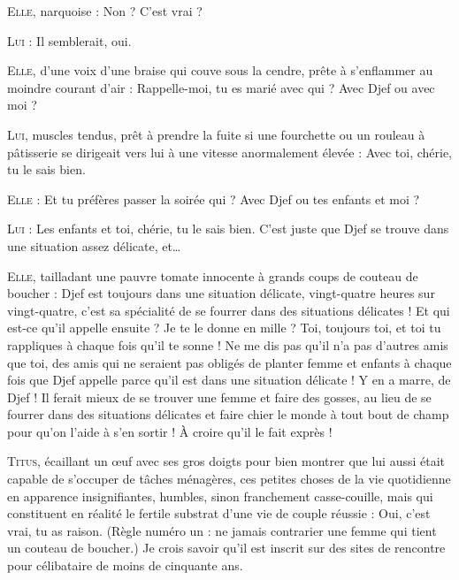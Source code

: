 \begin{dialogue}
\textsc{Elle}, narquoise : Non ? C’est vrai ?

\textsc{Lui} : Il semblerait, oui.

\textsc{Elle}, d’une voix d’une braise qui couve sous la cendre, prête à s’enflammer au moindre courant d’air : Rappelle-moi, tu es marié avec qui ? Avec Djef ou avec moi ?

\textsc{Lui}, muscles tendus, prêt à prendre la fuite si une fourchette ou un rouleau à pâtisserie se dirigeait vers lui à une vitesse anormalement élevée : Avec toi, chérie, tu le sais bien.

\textsc{Elle} : Et tu préfères passer la soirée qui ? Avec Djef ou tes enfants et moi ?

\textsc{Lui} : Les enfants et toi, chérie, tu le sais bien. C’est juste que Djef se trouve dans une situation assez délicate, et…

%
%
%
\textsc{Elle}, tailladant une pauvre tomate innocente à grands coups de couteau de boucher : Djef est toujours dans une situation délicate, vingt-quatre heures sur vingt-quatre, c’est sa spécialité de se fourrer dans des situations délicates ! Et qui est-ce qu’il appelle ensuite ? Je te le donne en mille ? Toi, toujours toi, et toi tu rappliques à chaque fois qu’il te sonne ! Ne me dis pas qu’il n’a pas d’autres amis que toi, des amis qui ne seraient pas obligés de planter femme et enfants à chaque fois que Djef appelle parce qu’il est dans une situation délicate ! Y en a marre, de Djef ! Il ferait mieux de se trouver une femme et faire des gosses, au lieu de se fourrer dans des situations délicates et faire chier le monde à tout bout de champ pour qu’on l’aide à s’en sortir ! À croire qu’il le fait exprès ! \clearpage 

%
%
%
\textsc{Titus}, écaillant un œuf avec ses gros doigts pour bien montrer que lui aussi était capable de s’occuper de tâches ménagères, ces petites choses de la vie quotidienne en apparence insignifiantes, humbles, sinon franchement casse-couille, mais qui constituent en réalité le fertile substrat d’une vie de couple réussie : Oui, c’est vrai, tu as raison. (Règle numéro un : ne jamais contrarier une femme qui tient un couteau de boucher.) Je crois savoir qu’il est inscrit sur des sites de rencontre pour célibataire de moins de cinquante ans.


\end{dialogue}
